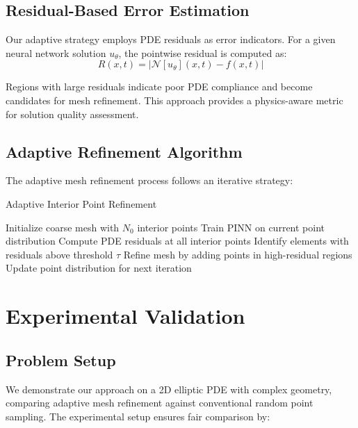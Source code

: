 \documentclass[11pt,a4paper]{article}
\begin{document}
\subsection{Residual-Based Error Estimation}

Our adaptive strategy employs PDE residuals as error indicators. For a given neural network solution $u_\theta$, the pointwise residual is computed as:
\begin{equation}
R(x, t) = |\mathcal{N}[u_\theta](x, t) - f(x, t)|
\end{equation}

Regions with large residuals indicate poor PDE compliance and become candidates for mesh refinement. This approach provides a physics-aware metric for solution quality assessment.

\subsection{Adaptive Refinement Algorithm}

The adaptive mesh refinement process follows an iterative strategy:

\begin{algorithm}[H]
\caption{Adaptive Interior Point Refinement}
\begin{algorithmic}
\STATE Initialize coarse mesh with $N_0$ interior points
    \STATE Train PINN on current point distribution
    \STATE Compute PDE residuals at all interior points
    \STATE Identify elements with residuals above threshold $\tau$
    \STATE Refine mesh by adding points in high-residual regions
    \STATE Update point distribution for next iteration
\ENDFOR
\end{algorithmic}
\end{algorithm}

\section{Experimental Validation}

\subsection{Problem Setup}

We demonstrate our approach on a 2D elliptic PDE with complex geometry, comparing adaptive mesh refinement against conventional random point sampling. The experimental setup ensures fair comparison by:
\end{document}
